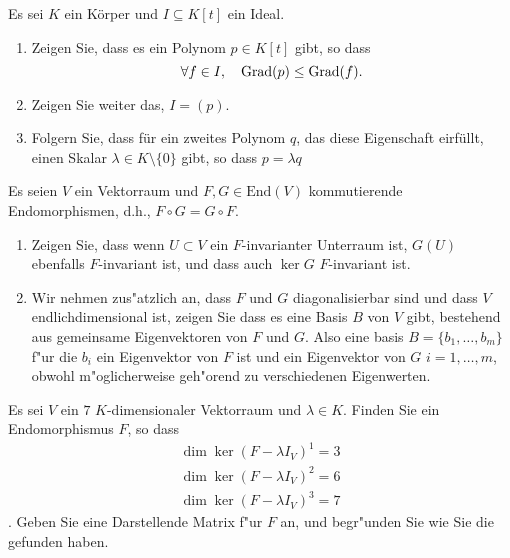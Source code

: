 \documentclass[a4,11pt]{article}
\begin{document}
\vspace*{-17mm}
{
\kopf
}


\begin{aufgabe}[4 Punkte]
Es sei $K$ ein K\"orper und $I \subseteq K[t]$ ein Ideal.

\begin{enumerate}
\item Zeigen Sie, dass es ein Polynom $p \in K[t]$ gibt, so dass
\[
\forall f \in I, \quad \operatorname{Grad} (p) \leq \operatorname{Grad} (f).
\]
\item Zeigen Sie weiter das, $I = (p)$.
\item Folgern Sie, dass f\"ur ein zweites Polynom $q$, das diese Eigenschaft eirf\"ullt, einen Skalar $\lambda \in K \setminus \{0\}$ gibt, so dass $p = \lambda q$
\end{enumerate}

\end{aufgabe}

\begin{aufgabe}[4 Punkte]

Es seien $V$ ein Vektorraum und $F, G \in \text{End}(V)$ kommutierende Endomorphismen, d.h., $F \circ G = G \circ F$.
\begin{enumerate}
\item
Zeigen Sie, dass wenn $U \subset V$ ein $F$-invarianter Unterraum ist, $G(U)$ ebenfalls $F$-invariant ist, und dass auch $\ker G$  $F$-invariant ist.

\item Wir nehmen zus"atzlich an, dass  $F$ und $G$ diagonalisierbar sind und dass $V$ endlichdimensional ist, zeigen Sie dass es eine Basis $B$ von $V$ gibt, bestehend aus gemeinsame Eigenvektoren von $F$ und $G$. Also eine basis $B = \{ b_1, \dots , b_m\}$ f"ur die $b_i$ ein Eigenvektor von $F$ ist und ein Eigenvektor von $G$ $i = 1, \dots , m$, obwohl m"oglicherweise geh"orend zu verschiedenen Eigenwerten.
\end{enumerate}
\end{aufgabe}


\begin{aufgabe}[4 Punkte]
Es sei $V$ ein $7$ $K$-dimensionaler Vektorraum und $\lambda \in K$. Finden Sie ein Endomorphismus $F$, so dass
\begin{align*}
\dim \ker (F -\lambda I_V)^1 = 3\\
\dim \ker (F -\lambda I_V)^2 = 6 \\
\dim \ker (F -\lambda I_V)^3 = 7
\end{align*}.
Geben Sie eine Darstellende Matrix f"ur $F$ an, und begr"unden Sie wie Sie die gefunden haben.
\end{aufgabe}
\end{document}
